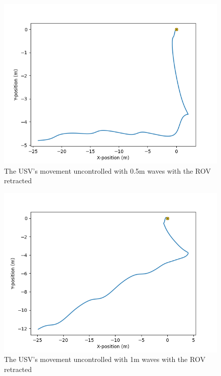 \documentclass[class=article, crop=false]{standalone}
\begin{document}
\begin{figure}
    \centering
    \includegraphics{scenario1/rov-0m/0.5m/usv_position_uncontrolled}
    \caption{The USV's movement uncontrolled with 0.5m waves with the ROV retracted}
    \label{fig:0.5m-uncontrolled}
\end{figure}

\begin{figure}
    \centering
    \includegraphics{scenario1/rov-0m/1.0m/usv_position_uncontrolled}
    \caption{The USV's movement uncontrolled with 1m waves with the ROV retracted}
    \label{fig:1.0m-uncontrolled}
\end{figure}
\end{document}
